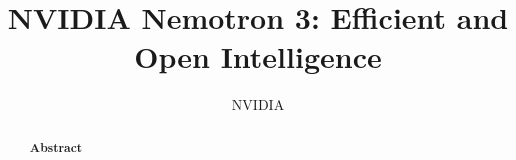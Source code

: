 \documentclass[11pt, logo, onecolumn, copyright, colorlinks=true, allcolors=blue]{nvidiatechreport}
\title{NVIDIA Nemotron 3: Efficient and Open Intelligence}
\author{\large NVIDIA}
\date{}
\begin{document}
\begin{abstract}
\large \textbf{Abstract}

\end{abstract}

\maketitle












% 
\end{document}
